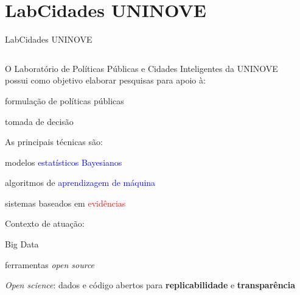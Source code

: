 \documentclass[aspectratio=169]{beamer}                    %
\begin{document}
\section{LabCidades UNINOVE}
\begin{frame}{LabCidades UNINOVE}
    \begin{columns}
        \begin{column}{0.8\textwidth}
            \begin{vfilleditems}
                \item O Laboratório de Políticas Públicas e Cidades Inteligentes da UNINOVE possui como objetivo elaborar pesquisas para apoio à:
                \begin{vfilleditems}
                    \small
                    \item formulação de políticas públicas
                    \item tomada de decisão
                \end{vfilleditems}
                \item As principais técnicas são:
                \begin{vfilleditems}
                    \small
                    \item modelos \textcolor{blue}{estatísticos Bayesianos}
                    \item algoritmos de \textcolor{blue}{aprendizagem de máquina}
                    \item sistemas baseados em \textcolor{red}{evidências}
                \end{vfilleditems}
                \item Contexto de atuação:
                \begin{vfilleditems}
                    \small
                    \item Big Data
                    \item ferramentas \textit{open source}
                    \item \textit{Open science}: \footnotesize dados e código abertos para \textbf{replicabilidade} e \textbf{transparência}
                \end{vfilleditems}
            \end{vfilleditems}
        \end{column}
        \begin{column}{0.2\textwidth}
            \centering

\end{column}
\end{columns}
\end{frame}
\end{document}
